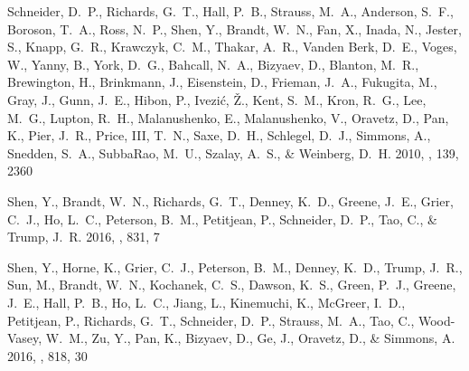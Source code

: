 \documentclass[iop]{emulateapj}
\begin{document}
\begin{thebibliography}{61}
{Schneider}, D.~P., {Richards}, G.~T., {Hall}, P.~B., {Strauss}, M.~A.,
  {Anderson}, S.~F., {Boroson}, T.~A., {Ross}, N.~P., {Shen}, Y., {Brandt},
  W.~N., {Fan}, X., {Inada}, N., {Jester}, S., {Knapp}, G.~R., {Krawczyk},
  C.~M., {Thakar}, A.~R., {Vanden Berk}, D.~E., {Voges}, W., {Yanny}, B.,
  {York}, D.~G., {Bahcall}, N.~A., {Bizyaev}, D., {Blanton}, M.~R.,
  {Brewington}, H., {Brinkmann}, J., {Eisenstein}, D., {Frieman}, J.~A.,
  {Fukugita}, M., {Gray}, J., {Gunn}, J.~E., {Hibon}, P., {Ivezi{\'c}}, {\v
  Z}., {Kent}, S.~M., {Kron}, R.~G., {Lee}, M.~G., {Lupton}, R.~H.,
  {Malanushenko}, E., {Malanushenko}, V., {Oravetz}, D., {Pan}, K., {Pier},
  J.~R., {Price}, III, T.~N., {Saxe}, D.~H., {Schlegel}, D.~J., {Simmons}, A.,
  {Snedden}, S.~A., {SubbaRao}, M.~U., {Szalay}, A.~S., \& {Weinberg}, D.~H.
  2010, \aj, 139, 2360

{Shen}, Y., {Brandt}, W.~N., {Richards}, G.~T., {Denney}, K.~D., {Greene},
  J.~E., {Grier}, C.~J., {Ho}, L.~C., {Peterson}, B.~M., {Petitjean}, P.,
  {Schneider}, D.~P., {Tao}, C., \& {Trump}, J.~R. 2016{}, \apj,
  831, 7

{Shen}, Y., {Horne}, K., {Grier}, C.~J., {Peterson}, B.~M., {Denney}, K.~D.,
  {Trump}, J.~R., {Sun}, M., {Brandt}, W.~N., {Kochanek}, C.~S., {Dawson},
  K.~S., {Green}, P.~J., {Greene}, J.~E., {Hall}, P.~B., {Ho}, L.~C., {Jiang},
  L., {Kinemuchi}, K., {McGreer}, I.~D., {Petitjean}, P., {Richards}, G.~T.,
  {Schneider}, D.~P., {Strauss}, M.~A., {Tao}, C., {Wood-Vasey}, W.~M., {Zu},
  Y., {Pan}, K., {Bizyaev}, D., {Ge}, J., {Oravetz}, D., \& {Simmons}, A.
  2016{}, \apj, 818, 30


\end{thebibliography}
\end{document}
